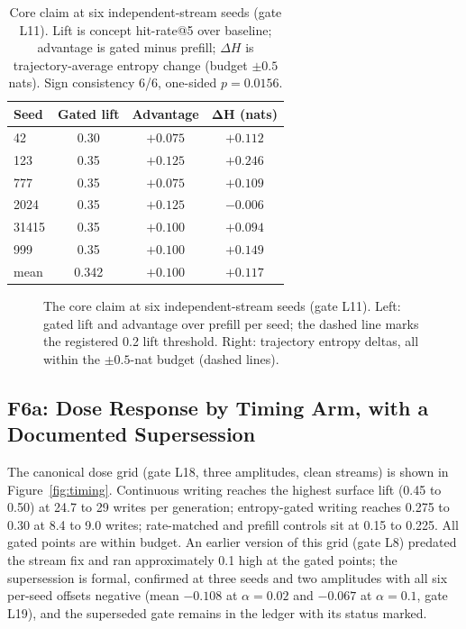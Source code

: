 \begin{table}[t]
\caption{Core claim at six independent-stream seeds (gate L11). Lift is concept hit-rate@5 over baseline; advantage is gated minus prefill; $\Delta H$ is trajectory-average entropy change (budget $\pm0.5$ nats). Sign consistency 6/6, one-sided $p=0.0156$.}
\label{tab:core}
\vskip 0.1in
\centering
{\small
\begin{tabular}{lccc}
\toprule
\textbf{Seed} & \textbf{Gated lift} & \textbf{Advantage} & $\bm{\Delta H}$ \textbf{(nats)} \\
\midrule
42    & 0.30 & $+0.075$ & $+0.112$ \\
123   & 0.35 & $+0.125$ & $+0.246$ \\
777   & 0.35 & $+0.075$ & $+0.109$ \\
2024  & 0.35 & $+0.125$ & $-0.006$ \\
31415 & 0.35 & $+0.100$ & $+0.094$ \\
999   & 0.35 & $+0.100$ & $+0.149$ \\
\midrule
mean  & 0.342 & $+0.100$ & $+0.117$ \\
\bottomrule
\end{tabular}}
\end{table}

\begin{figure}[t]
\centering
\resizebox{\columnwidth}{!}{}
\caption{The core claim at six independent-stream seeds (gate L11). Left: gated lift and advantage over prefill per seed; the dashed line marks the registered 0.2 lift threshold. Right: trajectory entropy deltas, all within the $\pm0.5$-nat budget (dashed lines).}
\label{fig:core}
\end{figure}

\subsection{F6a: Dose Response by Timing Arm, with a Documented Supersession}
\label{sec:results:dose}

The canonical dose grid (gate L18, three amplitudes, clean streams) is shown in Figure~\ref{fig:timing}. Continuous writing reaches the highest surface lift (0.45 to 0.50) at 24.7 to 29 writes per generation; entropy-gated writing reaches 0.275 to 0.30 at 8.4 to 9.0 writes; rate-matched and prefill controls sit at 0.15 to 0.225. All gated points are within budget. An earlier version of this grid (gate L8) predated the stream fix and ran approximately 0.1 high at the gated points; the supersession is formal, confirmed at three seeds and two amplitudes with all six per-seed offsets negative (mean $-0.108$ at $\alpha=0.02$ and $-0.067$ at $\alpha=0.1$, gate L19), and the superseded gate remains in the ledger with its status marked.

